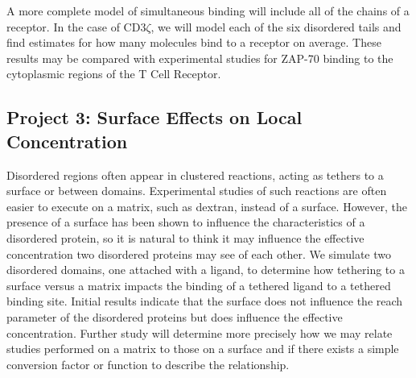 \documentclass[onecolumn]{article}
\begin{document}
A more complete model of simultaneous binding will include all of the chains of a receptor. In the case of CD3$\zeta$, we will model each of the six disordered tails and find estimates for how many molecules bind to a receptor on average. These results may be compared with experimental studies for ZAP-70 binding to the cytoplasmic regions of the T Cell Receptor.


\subsection*{Project 3: Surface Effects on Local Concentration}

Disordered regions often appear in clustered reactions, acting as tethers to a surface or between domains. Experimental studies of such reactions are often easier to execute on a matrix, such as dextran, instead of a surface. However, the presence of a surface has been shown to influence the characteristics of a disordered protein, so it is natural to think it may influence the effective concentration two disordered proteins may see of each other. We simulate two disordered domains, one attached with a ligand, to determine how tethering to a surface versus a matrix impacts the binding of a tethered ligand to a tethered binding site. Initial results indicate that the surface does not influence the reach parameter of the disordered proteins but does influence the effective concentration. Further study will determine more precisely how we may relate studies performed on a matrix to those on a surface and if there exists a simple conversion factor or function to describe the relationship.






\end{document}

